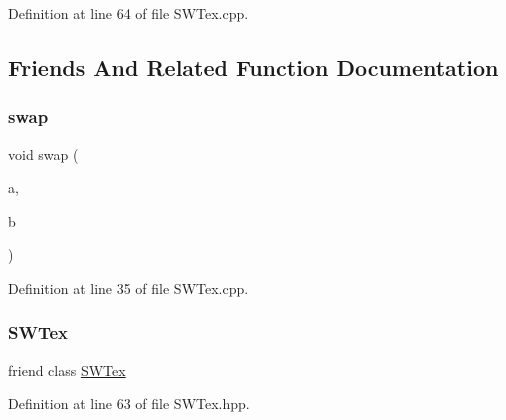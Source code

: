 Definition at line 64 of file S\+W\+Tex.\+cpp.



\subsection{Friends And Related Function Documentation}
\mbox{\label{classrolmodl_1_1_s_w_tex___base_a8f89877a58a353f571b9e38984370a8c}} 
\subsubsection{\texorpdfstring{swap}{swap}}
{\footnotesize\ttfamily void swap (\begin{DoxyParamCaption}\item[{\mbox{\hyperlink{classrolmodl_1_1_s_w_tex___base}{S\+W\+Tex\+\_\+\+Base}} \&}]{a,  }\item[{\mbox{\hyperlink{classrolmodl_1_1_s_w_tex___base}{S\+W\+Tex\+\_\+\+Base}} \&}]{b }\end{DoxyParamCaption})\hspace{0.3cm}{\ttfamily [friend]}}



Definition at line 35 of file S\+W\+Tex.\+cpp.

\mbox{\label{classrolmodl_1_1_s_w_tex___base_a3d1245d0f096d44c013059f01b277a92}} 
\subsubsection{\texorpdfstring{SWTex}{SWTex}}
{\footnotesize\ttfamily friend class \mbox{\hyperlink{classrolmodl_1_1_s_w_tex}{S\+W\+Tex}}\hspace{0.3cm}{\ttfamily [friend]}}



Definition at line 63 of file S\+W\+Tex.\+hpp.

\mbox{\label{classrolmodl_1_1_s_w_tex___base_a8d9bdf64a44bae4457e97cb082f21c42}} 
